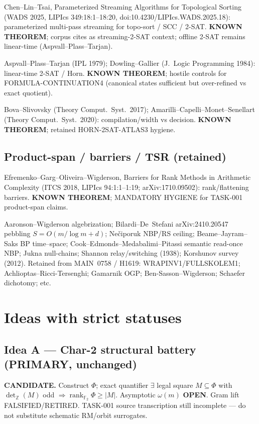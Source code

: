 \documentclass[11pt]{article}
\begin{document}
Chen--Lin--Tsai, Parameterized Streaming Algorithms for Topological Sorting
(WADS 2025, LIPIcs 349:18:1--18:20, doi:10.4230/LIPIcs.WADS.2025.18):
parameterized multi-pass streaming for topo-sort / SCC / 2-SAT.
\textbf{KNOWN THEOREM}; corpus cites as streaming-2-SAT context; offline 2-SAT remains linear-time
(Aspvall--Plass--Tarjan).

Aspvall--Plass--Tarjan (IPL 1979); Dowling--Gallier (J.\ Logic Programming 1984):
linear-time 2-SAT / Horn.
\textbf{KNOWN THEOREM}; hostile controls for FORMULA-CONTINUATION4 (canonical states sufficient
but over-refined vs exact quotient).

Bova--Slivovsky (Theory Comput.\ Syst.\ 2017); Amarilli--Capelli--Monet--Senellart
(Theory Comput.\ Syst.\ 2020): compilation/width vs decision.
\textbf{KNOWN THEOREM}; retained HORN-2SAT-ATLAS3 hygiene.

\subsection*{Product-span / barriers / TSR (retained)}
Efremenko--Garg--Oliveira--Wigderson, Barriers for Rank Methods in Arithmetic Complexity
(ITCS 2018, LIPIcs 94:1:1--1:19; arXiv:1710.09502): rank/flattening barriers.
\textbf{KNOWN THEOREM}; MANDATORY HYGIENE for TASK-001 product-span claims.

Aaronson--Wigderson algebrization; Bilardi--De~Stefani arXiv:2410.20547 pebbling
$S=O(m/\log m+d)$; Ne\v{c}iporuk NBP/RS ceiling; Beame--Jayram--Saks BP time--space;
Cook--Edmonds--Medabalimi--Pitassi semantic read-once NBP; Jukna null-chains;
Shannon relay/switching (1938); Korshunov survey (2012).
Retained from MAIN~0758 / H1619: WRAPINV1/FULLSKOLEM1; Achlioptas--Ricci-Tersenghi;
Gamarnik OGP; Ben-Sasson--Wigderson; Schaefer dichotomy; etc.

\section*{Ideas with strict statuses}
\subsection*{Idea A --- Char-2 structural battery (PRIMARY, unchanged)}
\textbf{CANDIDATE.} Construct $\Phi$; exact quantifier
$\exists$ legal square $M\subseteq\Phi$ with $\det_{\mathbb Z}(M)$ odd
$\Rightarrow\operatorname{rank}_{\mathbb F_2}\Phi\ge|M|$. Asymptotic $\omega(m)$ \textbf{OPEN}.
Gram lift FALSIFIED/RETIRED. TASK-001 source transcription still incomplete --- do not
substitute schematic RM/orbit surrogates.
\end{document}
